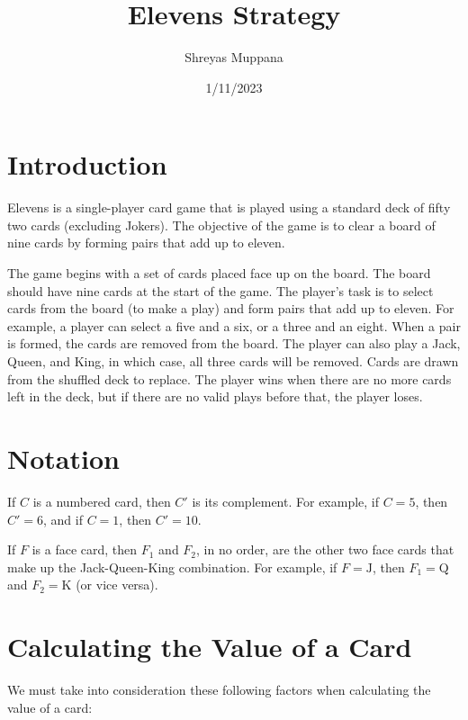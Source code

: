 \documentclass{article}
\title{Elevens Strategy}
\author{Shreyas Muppana}
\date{1/11/2023}
\begin{document}
\maketitle

\section{Introduction}

Elevens is a single-player card game that is played using a standard deck of fifty two cards (excluding Jokers). The objective of the game is to clear a board of nine cards by forming pairs that add up to eleven.

The game begins with a set of cards placed face up on the board. The board should have nine cards at the start of the game. The player's task is to select cards from the board (to make a play) and form pairs that add up to eleven. For example, a player can select a five and a six, or a three and an eight. When a pair is formed, the cards are removed from the board. The player can also play a Jack, Queen, and King, in which case, all three cards will be removed. Cards are drawn from the shuffled deck to replace. The player wins when there are no more cards left in the deck, but if there are no valid plays before that, the player loses.

\section{Notation}

If $C$ is a numbered card, then $C'$ is its complement. For example, if $C = 5$, then $C' = 6$, and if $C = 1$, then $C' = 10$.

If $F$ is a face card, then $F_1$ and $F_2$, in no order, are the other two face cards that make up the Jack-Queen-King combination. For example, if $F = \text{J}$, then $F_1 = \text{Q}$ and $F_2 = \text{K}$ (or vice versa).

\section{Calculating the Value of a Card}

We must take into consideration these following factors when calculating the value of a card:
\end{document}

